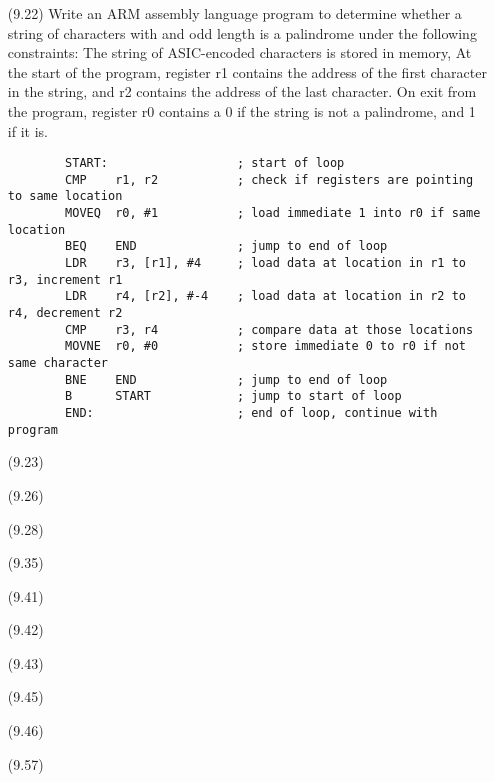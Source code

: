 \documentclass[letterpaper,10pt,titlepage]{article}
\begin{document}
\begin{enumerate}
	\item[(9.22)] Write an ARM assembly language program to determine whether a string
		of characters with and odd length is a palindrome under the following
		constraints: The string of ASIC-encoded characters is stored in memory, At
		the start of the program, register r1 contains the address of the first
		character in the string, and r2 contains the address of the last
		character. On exit from the program, register r0 contains a 0 if the
		string is not a palindrome, and 1 if it is.
		\\
		\begin{verbatim}
		START:                  ; start of loop
		CMP    r1, r2           ; check if registers are pointing to same location
		MOVEQ  r0, #1           ; load immediate 1 into r0 if same location
		BEQ    END              ; jump to end of loop
		LDR    r3, [r1], #4     ; load data at location in r1 to r3, increment r1
		LDR    r4, [r2], #-4    ; load data at location in r2 to r4, decrement r2
		CMP    r3, r4           ; compare data at those locations
		MOVNE  r0, #0           ; store immediate 0 to r0 if not same character
		BNE    END              ; jump to end of loop
		B      START            ; jump to start of loop
		END:                    ; end of loop, continue with program
		\end{verbatim}
	\item[(9.23)]
	\item[(9.26)]
	\item[(9.28)]
	\item[(9.35)]
	\item[(9.41)]
	\item[(9.42)]
	\item[(9.43)]
	\item[(9.45)]
	\item[(9.46)]
	\item[(9.57)]

\end{enumerate}
\end{document}

